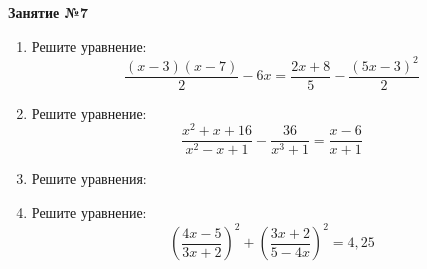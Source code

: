 \documentclass[12pt, a4paper]{article}
\begin{document}
	
	   \cfoot{}
	\begin{center}
		\Large
		\textbf{Занятие №7}
	\end{center}
	\begin{enumerate}[label=\textbf{\arabic*.}]
		\item Решите уравнение: $$\dfrac{(x-3)(x-7)}{2}-6x=\dfrac{2x+8}{5}-\dfrac{(5x-3)^2}{2}$$
		\item Решите уравнение: $$\dfrac{x^2+x+16}{x^2-x+1}-\dfrac{36}{x^3+1}=\dfrac{x-6}{x+1}$$
		\item Решите уравнения:
		\begin{enumerate}[label=\asbuk*)]
		\end{enumerate}
		\item Решите уравнение: $$\left( \dfrac{4x-5}{3x+2} \right)^2+\left( \dfrac{3x+2}{5-4x} \right)^2=4,25$$
	\end{enumerate}
\end{document}

